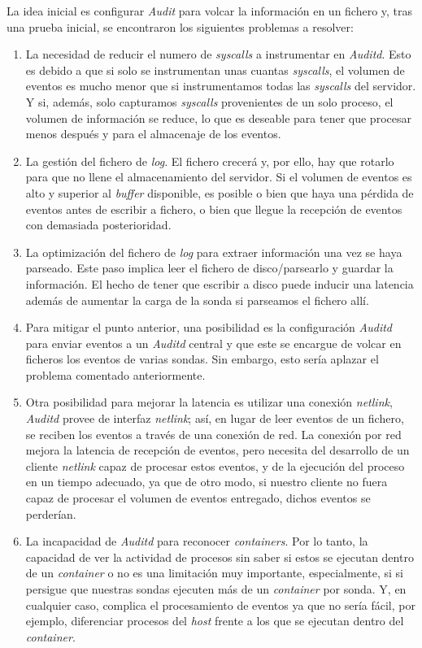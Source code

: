 La idea inicial es configurar \emph{Audit} para volcar la información en un fichero y, tras una prueba inicial, se encontraron los siguientes problemas a resolver:

\begin{enumerate}
    \item La necesidad de reducir el numero de \emph{syscalls} a instrumentar en \emph{Auditd}. Esto es debido a que si solo se instrumentan unas cuantas \emph{syscalls}, el volumen de eventos es mucho menor que si
    instrumentamos todas las \emph{syscalls} del servidor. Y si, además, solo capturamos \emph{syscalls} provenientes de un solo proceso, el volumen de información se reduce, lo que es 
    deseable para tener que procesar menos después y para el almacenaje de los eventos.
    \item La gestión del fichero de \emph{log}. El fichero crecerá y, por ello, hay que rotarlo para que no llene el almacenamiento del servidor. Si el volumen de eventos es alto y superior 
    al \emph{buffer} disponible, es posible o bien que haya una pérdida de eventos antes de escribir a fichero, o bien que llegue la recepción de eventos con demasiada posterioridad.
    \item La optimización del fichero de \emph{log} para extraer información una vez se haya parseado. Este paso implica leer el fichero de disco/parsearlo y guardar la información. El hecho de tener que escribir a disco puede inducir una latencia además de aumentar la carga de la sonda si parseamos el fichero allí.
    \item Para mitigar el punto anterior, una posibilidad es la configuración  \emph{Auditd} para enviar eventos a un \emph{Auditd} central y que este se encargue de volcar en ficheros los eventos de varias sondas. Sin embargo, esto sería aplazar el problema
    comentado anteriormente.
    \item Otra posibilidad para mejorar la latencia es utilizar una conexión \emph{netlink},
    \emph{Auditd} provee de interfaz \emph{netlink}; así, en lugar de leer eventos de un fichero, 
    se reciben los eventos a través de una conexión de red. 
    La conexión por red mejora la latencia de recepción de eventos, 
    pero necesita del desarrollo de un cliente \emph{netlink} capaz de procesar estos eventos, 
    y de la ejecución del proceso en un tiempo adecuado, ya que de otro modo, 
    si nuestro cliente no fuera capaz de procesar el volumen de eventos entregado,
    dichos eventos se perderían.
    \item La incapacidad de \emph{Auditd} para reconocer \emph{containers}. Por lo tanto, la capacidad de ver la actividad de procesos
    sin saber si estos se ejecutan dentro de un \emph{container} o no es una limitación muy importante, especialmente, si si persigue que nuestras sondas
    ejecuten más de un \emph{container} por sonda. Y, en cualquier caso, complica el procesamiento de eventos ya que no sería fácil, por ejemplo, diferenciar procesos
    del \emph{host} frente a los que se ejecutan dentro del \emph{container}.
\end{enumerate}

